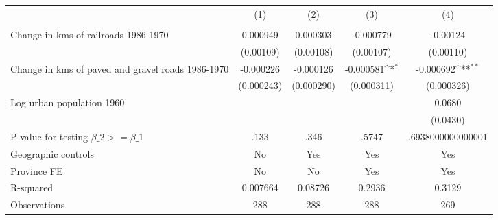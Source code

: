 {
\def\sym#1{\ifmmode^{#1}\else\(^{#1}\)\fi}
\begin{tabular}{l*{4}{c}}
\hline\hline
                &\multicolumn{1}{c}{(1)}&\multicolumn{1}{c}{(2)}&\multicolumn{1}{c}{(3)}&\multicolumn{1}{c}{(4)}\\
                &\multicolumn{1}{c}{}&\multicolumn{1}{c}{}&\multicolumn{1}{c}{}&\multicolumn{1}{c}{}\\
\hline
Change in kms of railroads 1986-1970& 0.000949         & 0.000303         &-0.000779         & -0.00124         \\
                &(0.00109)         &(0.00108)         &(0.00107)         &(0.00110)         \\
[1em]
Change in kms of paved and gravel roads 1986-1970&-0.000226         &-0.000126         &-0.000581\sym{*}  &-0.000692\sym{**} \\
                &(0.000243)         &(0.000290)         &(0.000311)         &(0.000326)         \\
[1em]
Log urban population 1960&                  &                  &                  &   0.0680         \\
                &                  &                  &                  & (0.0430)         \\
\hline
P-value for testing $\beta\_{2} >= \beta\_{1}$&     .133         &     .346         &    .5747         &.6938000000000001         \\
Geographic controls&       No         &      Yes         &      Yes         &      Yes         \\
Province FE     &       No         &       No         &      Yes         &      Yes         \\
R-squared       & 0.007664         &  0.08726         &   0.2936         &   0.3129         \\
Observations    &      288         &      288         &      288         &      269         \\
\hline\hline
\end{tabular}
}

